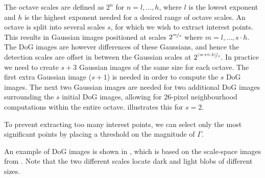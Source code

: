 \documentclass[thesis.tex]{subfiles}
\begin{document}
The octave scales are defined as $2^n$ for $n = l,\hdots,h$, where $l$ is the lowest exponent and $h$ is the highest exponent needed for a desired range of octave scales. An octave is split into several scales $s$, for which we wish to extract interest points. This results in Gaussian images positioned at scales $2^{\nicefrac{m}{s}}$ where $m = l,\hdots,s \cdot h$. The DoG images are however differences of these Gaussians, and hence the detection scales are offset in between the Gaussian scales at $2^{\nicefrac{(m+0.5)}{s}}$.
In practice we need to create $s+3$ Gaussian images of the same size for each octave. The first extra Gaussian image ($s+1$) is needed in order to compute the $s$ DoG images. The next two Gaussian images are needed for two additional DoG images surrounding the $s$ initial DoG images, allowing for 26-pixel neighbourhood computations within the entire octave.  illustrates this for $s = 2$.

To prevent extracting too many interest points, we can select only the most significant points by placing a threshold on the magnitude of $\Gamma$.

An example of DoG images is shown in , which is based on the scale-space images from . Note that the two different scales locate dark and light blobs of different sizes.
\end{document}
